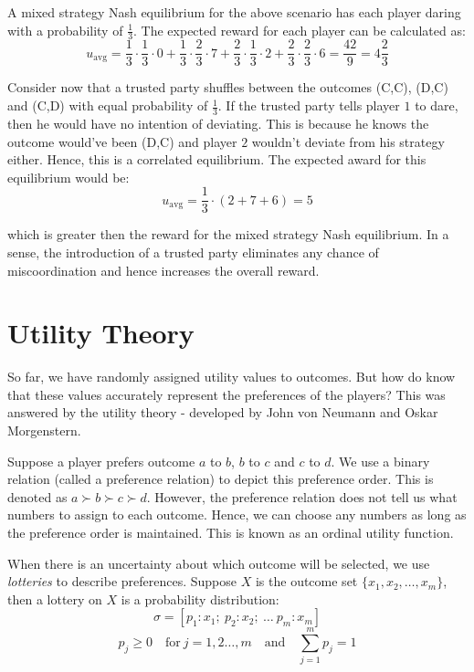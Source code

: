\documentclass{article}
\theoremstyle{definition}
\begin{document}
A mixed strategy Nash equilibrium for the above scenario has each player daring with a probability of $\frac{1}{3}$. The expected reward for each player can be calculated as:
\[
    u_{\text{avg}} = \frac{1}{3} \cdot \frac{1}{3} \cdot 0 + \frac{1}{3} \cdot \frac{2}{3} \cdot 7 + \frac{2}{3} \cdot \frac{1}{3} \cdot 2 + \frac{2}{3} \cdot \frac{2}{3} \cdot 6 = \frac{42}{9} = 4 \frac{2}{3}
\]
 
Consider now that a trusted party shuffles between the outcomes (C,C), (D,C) and (C,D) with equal probability of $\frac{1}{3}$. If the trusted party tells player $1$ to dare, then he would have no intention of deviating. This is because he knows the outcome would've been (D,C) and player $2$ wouldn't deviate from his strategy either. Hence, this is a correlated equilibrium. The expected award for this equilibrium would be:
\[
    u_{\text{avg}} = \frac{1}{3} \cdot \left( 2 + 7 + 6 \right) = 5
\]

which is greater then the reward for the mixed strategy Nash equilibrium. In a sense, the introduction of a trusted party eliminates any chance of miscoordination and hence increases the overall reward. 

\section{Utility Theory}

So far, we have randomly assigned utility values to outcomes. But how do know that these values accurately represent the preferences of the players? This was answered by the utility theory - developed by John von Neumann and Oskar Morgenstern. \medskip

Suppose a player prefers outcome $a$ to $b$, $b$ to $c$ and $c$ to $d$. We use a binary relation (called a preference relation) to depict this preference order. This is denoted as $a \succ b \succ c \succ d$. However, the preference relation does not tell us what numbers to assign to each outcome. Hence, we can choose any numbers as long as the preference order is maintained. This is known as an ordinal utility function. \medskip

When there is an uncertainty about which outcome will be selected, we use \textit{lotteries} to describe preferences. Suppose $X$ is the outcome set $\{ x_1, x_2, \ldots , x_m \}$, then a lottery on $X$ is a probability distribution:
\[
    \sigma = [ p_1 : x_1; \: p_2 : x_2; \: \ldots \: p_m : x_m ]
    \]
    \[
    p_j \geq 0 \quad \text{for} \: j = 1,2 \ldots , m \quad \text{and} \quad \sum_{j=1}^{m} p_j = 1
\]
\end{document}
